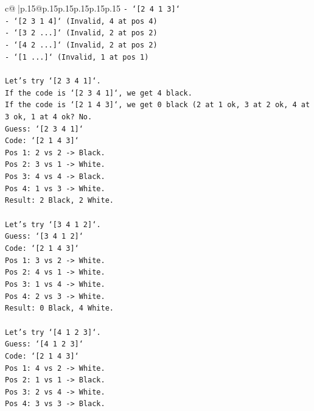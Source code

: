 \documentclass{article}
\begin{document}
{\begin{supertabular}{c@{$\;$}|p{.15\linewidth}@{}p{.15\linewidth}p{.15\linewidth}p{.15\linewidth}p{.15\linewidth}p{.15\linewidth}}
{{{\texttt{{-} `{[}2 4 1 3{]}`} \\
\texttt{{-} `{[}2 3 1 4{]}` (Invalid, 4 at pos 4)} \\
\texttt{{-} `{[}3 2 ...{]}` (Invalid, 2 at pos 2)} \\
\texttt{{-} `{[}4 2 ...{]}` (Invalid, 2 at pos 2)} \\
\texttt{{-} `{[}1 ...{]}` (Invalid, 1 at pos 1)} \\
\\ 
\texttt{Let's try `{[}2 3 4 1{]}`.} \\
\texttt{If the code is `{[}2 3 4 1{]}`, we get 4 black.} \\
\texttt{If the code is `{[}2 1 4 3{]}`, we get 0 black (2 at 1 ok, 3 at 2 ok, 4 at 3 ok, 1 at 4 ok? No.} \\
\texttt{Guess: `{[}2 3 4 1{]}`} \\
\texttt{Code: `{[}2 1 4 3{]}`} \\
\texttt{Pos 1: 2 vs 2 {-}> Black.} \\
\texttt{Pos 2: 3 vs 1 {-}> White.} \\
\texttt{Pos 3: 4 vs 4 {-}> Black.} \\
\texttt{Pos 4: 1 vs 3 {-}> White.} \\
\texttt{Result: 2 Black, 2 White.} \\
\\ 
\texttt{Let's try `{[}3 4 1 2{]}`.} \\
\texttt{Guess: `{[}3 4 1 2{]}`} \\
\texttt{Code: `{[}2 1 4 3{]}`} \\
\texttt{Pos 1: 3 vs 2 {-}> White.} \\
\texttt{Pos 2: 4 vs 1 {-}> White.} \\
\texttt{Pos 3: 1 vs 4 {-}> White.} \\
\texttt{Pos 4: 2 vs 3 {-}> White.} \\
\texttt{Result: 0 Black, 4 White.} \\
\\ 
\texttt{Let's try `{[}4 1 2 3{]}`.} \\
\texttt{Guess: `{[}4 1 2 3{]}`} \\
\texttt{Code: `{[}2 1 4 3{]}`} \\
\texttt{Pos 1: 4 vs 2 {-}> White.} \\
\texttt{Pos 2: 1 vs 1 {-}> Black.} \\
\texttt{Pos 3: 2 vs 4 {-}> White.} \\
\texttt{Pos 4: 3 vs 3 {-}> Black.} \\
}}}
\end{supertabular}}
\end{document}
